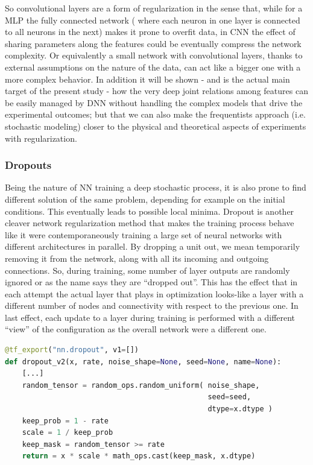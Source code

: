 So convolutional layers are a form of regularization in the sense that, while for a \ac{MLP} the fully connected network ( where each neuron in one layer is connected to all neurons in the next) makes it prone to overfit data, in \ac{CNN} the effect of sharing parameters along the features could be eventually compress the network complexity. Or equivalently a small network with convolutional layers, thanks to external assumptions on the nature of the data, can act like a bigger one with a more complex behavior.
%
In addition it will be shown - and is the actual main target of the present study - how the very deep joint relations among features can be easily managed by \ac{DNN} without handling the complex models that drive the experimental outcomes; but that we can also make the frequentists approach (i.e. stochastic modeling) closer to the physical and theoretical aspects of experiments with regularization.

\subsubsection{Dropouts}
Being the nature of NN training a deep stochastic process, it is also prone to find different solution of the same problem, depending for example on the initial conditions. This eventually leads to possible local minima. 
Dropout is another cleaver network regularization method that makes the training process behave like it were contemporaneously training a large set of neural networks with different architectures in parallel.
By dropping a unit out, we mean temporarily removing it from the network, along with all its incoming and outgoing connections.
So, during training, some number of layer outputs are randomly ignored or as the name says they are “dropped out”. This has the effect that in each attempt the actual layer that plays in optimization looks-like a layer with a different number of nodes and connectivity with respect to the previous one. In last effect, each update to a layer during training is performed with a different “view” of the configuration as the overall network were a different one.

\begin{lstlisting}[language=Python, caption=Dropout layer code example (from Tensorflow 2.0)]
@tf_export("nn.dropout", v1=[])
def dropout_v2(x, rate, noise_shape=None, seed=None, name=None):
    [...]
    random_tensor = random_ops.random_uniform( noise_shape, 
                                               seed=seed, 
                                               dtype=x.dtype )
    keep_prob = 1 - rate
    scale = 1 / keep_prob
    keep_mask = random_tensor >= rate
    return = x * scale * math_ops.cast(keep_mask, x.dtype)
\end{lstlisting}

